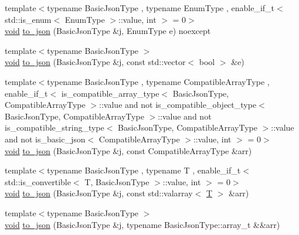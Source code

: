 \begin{DoxyCompactItemize}
\item 
{\footnotesize template$<$typename Basic\+Json\+Type , typename Enum\+Type , enable\+\_\+if\+\_\+t$<$ std\+::is\+\_\+enum$<$ Enum\+Type $>$\+::value, int $>$  = 0$>$ }\\\mbox{\hyperlink{namespacenlohmann_1_1detail_a59fca69799f6b9e366710cb9043aa77d}{void}} \mbox{\hyperlink{namespacenlohmann_1_1detail_a0c8b159dba71981d6c555d284cf6e2bf}{to\+\_\+json}} (Basic\+Json\+Type \&j, Enum\+Type e) noexcept
\item 
{\footnotesize template$<$typename Basic\+Json\+Type $>$ }\\\mbox{\hyperlink{namespacenlohmann_1_1detail_a59fca69799f6b9e366710cb9043aa77d}{void}} \mbox{\hyperlink{namespacenlohmann_1_1detail_aeca6fb5fede5ed1e12a4420d98a5692b}{to\+\_\+json}} (Basic\+Json\+Type \&j, const std\+::vector$<$ bool $>$ \&e)
\item 
{\footnotesize template$<$typename Basic\+Json\+Type , typename Compatible\+Array\+Type , enable\+\_\+if\+\_\+t$<$ is\+\_\+compatible\+\_\+array\+\_\+type$<$ Basic\+Json\+Type, Compatible\+Array\+Type $>$\+::value and not is\+\_\+compatible\+\_\+object\+\_\+type$<$ Basic\+Json\+Type, Compatible\+Array\+Type $>$\+::value and not is\+\_\+compatible\+\_\+string\+\_\+type$<$ Basic\+Json\+Type, Compatible\+Array\+Type $>$\+::value and not is\+\_\+basic\+\_\+json$<$ Compatible\+Array\+Type $>$\+::value, int $>$  = 0$>$ }\\\mbox{\hyperlink{namespacenlohmann_1_1detail_a59fca69799f6b9e366710cb9043aa77d}{void}} \mbox{\hyperlink{namespacenlohmann_1_1detail_a3afebc132c5ff83f9cd160e52030fdfd}{to\+\_\+json}} (Basic\+Json\+Type \&j, const Compatible\+Array\+Type \&arr)
\item 
{\footnotesize template$<$typename Basic\+Json\+Type , typename T , enable\+\_\+if\+\_\+t$<$ std\+::is\+\_\+convertible$<$ T, Basic\+Json\+Type $>$\+::value, int $>$  = 0$>$ }\\\mbox{\hyperlink{namespacenlohmann_1_1detail_a59fca69799f6b9e366710cb9043aa77d}{void}} \mbox{\hyperlink{namespacenlohmann_1_1detail_a7f7c7b9760161b774cdc0b4b838fae64}{to\+\_\+json}} (Basic\+Json\+Type \&j, const std\+::valarray$<$ \mbox{\hyperlink{_keyboard_event_8h_adf1f3edb9115acb0a1e04209b7a9937b}{T}} $>$ \&arr)
\item 
{\footnotesize template$<$typename Basic\+Json\+Type $>$ }\\\mbox{\hyperlink{namespacenlohmann_1_1detail_a59fca69799f6b9e366710cb9043aa77d}{void}} \mbox{\hyperlink{namespacenlohmann_1_1detail_aa0fd1b5788e9ba37e31da43dda738cb5}{to\+\_\+json}} (Basic\+Json\+Type \&j, typename Basic\+Json\+Type\+::array\+\_\+t \&\&arr)

\end{DoxyCompactItemize}
